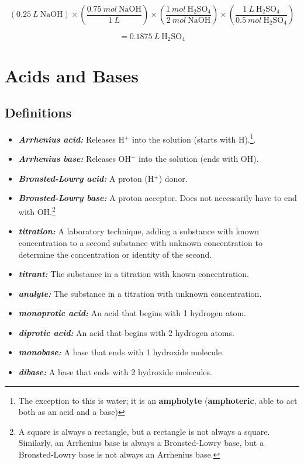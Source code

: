 \documentclass[a4paper, 12pt]{article}
\begin{document}
$$(0.25 \: L \: \text{NaOH}) \times \left(\frac{0.75 \: mol \: \text{NaOH}}{1 \: L}\right) \times \left(\frac{1 \: mol \: \text{H$_2$SO$_4$}}{2 \: mol \: \text{NaOH}}\right) \times \left(\frac{1 \: L \: \text{H$_2$SO$_4$}}{0.5 \: mol \: \text{H$_2$SO$_4$}}\right)$$

$$= \boxed{0.1875 \: L \: \text{H$_2$SO$_4$}}$$

\section{Acids and Bases}

\subsection*{Definitions}
\begin{itemize}[leftmargin=*, nosep]
    \item \textbf{\textit{Arrhenius acid:}} Releases H$^+$ into the solution (starts with H).\footnote{The exception to this is water; it is an \textbf{ampholyte} (\textbf{amphoteric}, able to act both as an acid and a base)}.
    \item \textbf{\textit{Arrhenius base:}} Releases OH$^-$ into the solution (ends with OH).
    \item \textbf{\textit{Bronsted-Lowry acid:}} A proton (H$^+$) donor.
    \item \textbf{\textit{Bronsted-Lowry base:}} A proton acceptor. Does not necessarily have to end with OH.\footnote{A square is always a rectangle, but a rectangle is not always a square. Similarly, an Arrhenius base is always a Bronsted-Lowry base, but a Bronsted-Lowry base is not always an Arrhenius base.}
    \item \textbf{\textit{titration:}} A laboratory technique, adding a substance with known concentration to a second substance with unknown concentration to determine the concentration or identity of the second.
    \item \textbf{\textit{titrant:}} The substance in a titration with known concentration.
    \item \textbf{\textit{analyte:}} The substance in a titration with unknown concentration.
    \item \textbf{\textit{monoprotic acid:}} An acid that begins with 1 hydrogen atom.
    \item \textbf{\textit{diprotic acid:}} An acid that begins with 2 hydrogen atoms.
    \item \textbf{\textit{monobase:}} A base that ends with 1 hydroxide molecule.
    \item \textbf{\textit{dibase:}} A base that ends with 2 hydroxide molecules.
\end{itemize}
\end{document}
